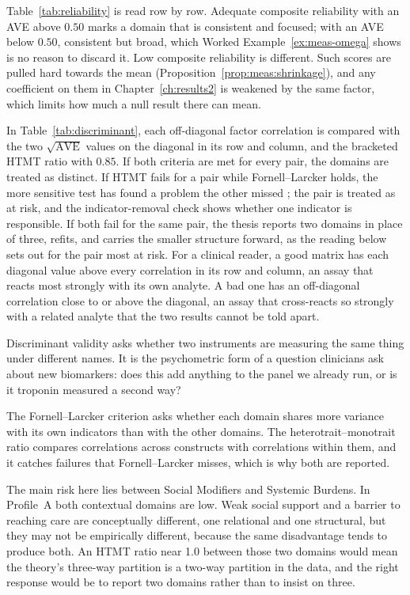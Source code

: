 \medskip
{}

Table~\ref{tab:reliability} is read row by row. Adequate composite reliability with an AVE above $0.50$ marks a domain that is consistent and focused; with an AVE below $0.50$, consistent but broad, which Worked Example~\ref{ex:meas-omega} shows is no reason to discard it. Low composite reliability is different. Such scores are pulled hard towards the mean (Proposition~\ref{prop:meas:shrinkage}), and any coefficient on them in Chapter~\ref{ch:results2} is weakened by the same factor, which limits how much a null result there can mean.

In Table~\ref{tab:discriminant}, each off-diagonal factor correlation is compared with the two $\sqrt{\mathrm{AVE}}$ values on the diagonal in its row and column, and the bracketed HTMT ratio with $0.85$. If both criteria are met for every pair, the domains are treated as distinct. If HTMT fails for a pair while Fornell--Larcker holds, the more sensitive test has found a problem the other missed \citep{henseler_2015}; the pair is treated as at risk, and the indicator-removal check shows whether one indicator is responsible. If both fail for the same pair, the thesis reports two domains in place of three, refits, and carries the smaller structure forward, as the reading below sets out for the pair most at risk. For a clinical reader, a good matrix has each diagonal value above every correlation in its row and column, an assay that reacts most strongly with its own analyte. A bad one has an off-diagonal correlation close to or above the diagonal, an assay that cross-reacts so strongly with a related analyte that the two results cannot be told apart.

\begin{reading}
Discriminant validity asks whether two instruments are measuring the same thing
under different names. It is the psychometric form of a question clinicians ask
about new biomarkers: does this add anything to the panel we already run, or is
it troponin measured a second way?

The Fornell--Larcker criterion asks whether each domain shares more variance
with its own indicators than with the other domains. The heterotrait--monotrait
ratio compares correlations across constructs with correlations within them,
and it catches failures that Fornell--Larcker misses, which is why both are
reported.

The main risk here lies between Social Modifiers and Systemic Burdens. In
Profile~A both contextual domains are low. Weak social support and a barrier to
reaching care are conceptually different, one relational and one structural,
but they may not be empirically different, because the same disadvantage tends
to produce both. An HTMT ratio near 1.0 between those two domains would mean
the theory's three-way partition is a two-way partition in the data, and the
right response would be to report two domains rather than to insist on
three.
\end{reading}

